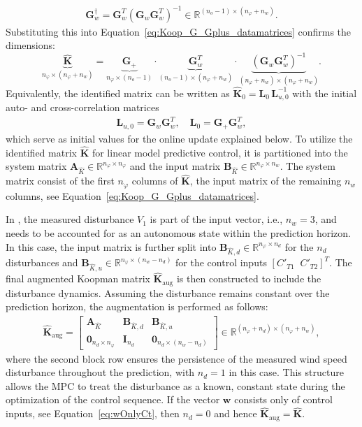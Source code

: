 \begin{align*}
    \bm{G}_w^{\dagger} = \bm{G}_w^T (\bm{G}_w \bm{G}_w^T)^{-1} \in \mathbb{R}^{(n_o-1) \times (n_\varphi + n_w)}.
\end{align*}
Substituting this into Equation~\eqref{eq:Koop_G_Gplus_datamatrices} confirms the dimensions:
\[
\underbrace{\hat{\bm{K}}}_{n_\varphi \times (n_\varphi + n_w)} =
\underbrace{\bm{G}_{+}}_{n_\varphi \times (n_o-1)} \cdot
\underbrace{\bm{G}_w^T}_{(n_o-1) \times (n_\varphi + n_w)} \cdot
\underbrace{(\bm{G}_w \bm{G}_w^T)^{-1}}_{(n_\varphi + n_w) \times (n_\varphi + n_w)}.
\]
Equivalently, the identified matrix can be written as $\hat{\bm{K}}_0 = \mathbf{L}_0\,\mathbf{L}_{u,0}^{-1}$ with the initial auto- and cross-correlation matrices
\begin{align*}
    \mathbf{L}_{u,0} = \bm{G}_w \bm{G}_w^T, \quad \mathbf{L}_0 = \bm{G}_{+} \bm{G}_w^T,
\end{align*}
which serve as initial values for the online update explained below.
%
To utilize the identified matrix $\hat{\bm{K}}$ for linear model predictive control, it is partitioned into the system matrix $\bm{A}_{\hat{K}} \in \mathbb{R}^{n_\varphi \times n_\varphi}$ and the input matrix $\bm{B}_{\hat{K}} \in \mathbb{R}^{n_\varphi \times n_w}$. The system matrix consist of the first $n_\varphi$ columns of $\hat{\bm{K}}$, the input matrix of the remaining  $n_w$ columns, see Equation~\eqref{eq:Koop_G_Gplus_datamatrices}.

In \cite{dittmer2022data}, the measured disturbance $V_1$ is part of the input vector, i.e., $n_w = 3$, and needs to be accounted for as an autonomous state within the prediction horizon. In this case, the input matrix is further split into $\bm{B}_{\hat{K},d} \in \mathbb{R}^{n_\varphi \times n_d}$ for the $n_d$ disturbances and $\bm{B}_{\hat{K},u} \in \mathbb{R}^{n_\varphi \times (n_w-n_d)}$ for the control inputs $[C'_{T1} \;\; C'_{T2}]^T$. The final augmented Koopman matrix $\hat{\bm{K}}_{\text{aug}}$ is then constructed to include the disturbance dynamics. Assuming the disturbance remains constant over the prediction horizon, the augmentation is performed as follows:
\begin{align}\label{eq:AugmentedKoopmanMPC}
    \hat{\bm{K}}_{\text{aug}} = \left[\begin{array}{cc|c}
        \bm{A}_{\hat{K}} & \bm{B}_{\hat{K},d} & \bm{B}_{\hat{K},u}\\
        \bm{0}_{n_d \times n_\varphi} & \bm{I}_{n_d} & \bm{0}_{n_d \times (n_w-n_d)}
    \end{array}\right] \in \mathbb{R}^{(n_\varphi+n_d) \times (n_\varphi+n_w)},
\end{align}
where the second block row ensures the persistence of the measured wind speed disturbance throughout the prediction, with $n_d = 1$ in this case. This structure allows the MPC to treat the disturbance as a known, constant state during the optimization of the control sequence. If the vector $\bm{w}$ consists only of control inputs, see Equation~\eqref{eq:wOnlyCt}, then $n_d = 0$ and hence $\hat{\bm{K}}_{\text{aug}} = \hat{\bm{K}}$.


